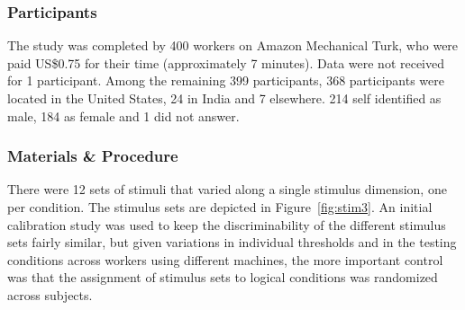 \documentclass[doc]{apa6}
\begin{document}
\subsubsection{Participants} The study was completed by 400 workers on Amazon Mechanical Turk, who were paid US\$0.75 for their time (approximately 7 minutes). Data were not received for 1 participant. Among the remaining 399 participants, 368 participants were located in the United States, 24 in India and 7 elsewhere. 214 self identified as male, 184 as female and 1 did not answer.

\subsubsection{Materials \& Procedure} There were 12 sets of stimuli that varied along a single stimulus dimension, one per condition. The stimulus sets are depicted in Figure~\ref{fig:stim3}. An initial calibration study was used to keep the discriminability of the different stimulus sets fairly similar, but given variations in individual thresholds and in the testing conditions across workers using different machines, the more important control was that the assignment of stimulus sets to logical conditions was randomized across subjects.
\end{document}
